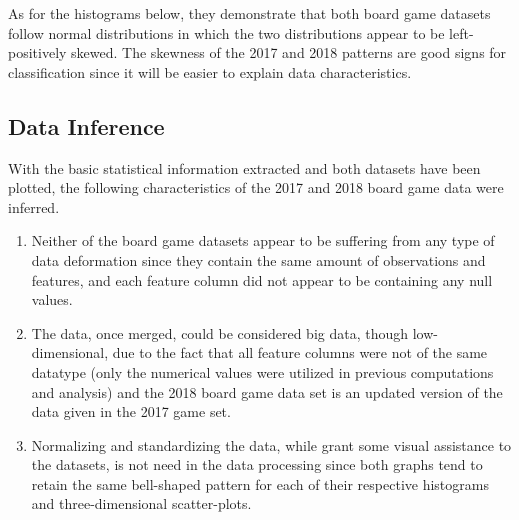 \documentclass[a4paper,12pt]{IEEEtran}
\begin{document}
As for the histograms below, they demonstrate that both board game datasets follow normal distributions in which the two distributions appear to be left-positively skewed. The skewness of the 2017 and 2018 patterns are good signs for classification since it will be easier to explain data characteristics.


\subsection{Data Inference}
\label{sec7}
With the basic statistical information extracted and both datasets have been plotted, the following characteristics of the 2017 and 2018 board game data were inferred.
\begin{enumerate}
\item Neither of the board game datasets appear to be suffering from any type of data deformation since they contain the same amount of observations and features, and each feature column did not appear to be containing any null values.
\item The data, once merged, could be considered big data, though low-dimensional, due to the fact that all feature columns were not of the same datatype (only the numerical values were utilized in previous computations and analysis) and the 2018 board game data set is an updated version of the data given in the 2017 game set.
\item Normalizing and standardizing the data, while grant some visual assistance to the datasets, is not need in the data processing since both graphs tend to retain the same bell-shaped pattern for each of their respective histograms and three-dimensional scatter-plots.
\end{enumerate}
\end{document}

